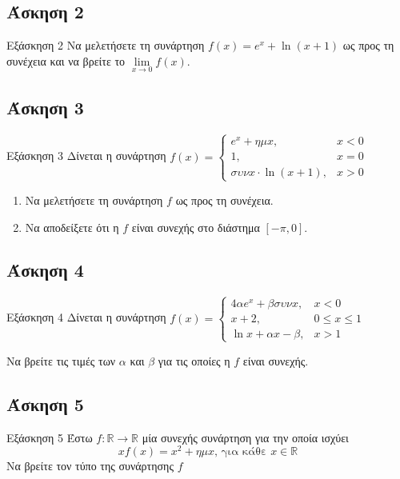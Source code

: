 \documentclass[greek]{beamer}
\begin{document}
\subsection{Άσκηση 2}
\begin{frame}[label=Άσκηση2]{Εξάσκηση 2}
 Να μελετήσετε τη συνάρτηση $f(x)=e^x+\ln (x+1)$ ως προς τη συνέχεια και να βρείτε το $\lim\limits_{x \to 0}{ f(x) }$.


\end{frame}

\subsection{Άσκηση 3}
\begin{frame}[label=Άσκηση3]{Εξάσκηση 3}
 Δίνεται η συνάρτηση $f(x)=\begin{cases}
   e^x+ημx,             & x<0 \\
   1,                   & x=0 \\
   συνx\cdot \ln (x+1), & x>0
  \end{cases}$
 \begin{enumerate}
  \item Να μελετήσετε τη συνάρτηση $f$ ως προς τη συνέχεια.
  \item Να αποδείξετε ότι η $f$ είναι συνεχής στο διάστημα $[-π,0]$.
 \end{enumerate}

\end{frame}


\subsection{Άσκηση 4}
\begin{frame}[label=Άσκηση4]{Εξάσκηση 4}
 Δίνεται η συνάρτηση $f(x)=\begin{cases}
   4αe^x+βσυνx, & x<0         \\
   x+2,         & 0\le x\le 1 \\
   \ln x+αx-β,  & x>1
  \end{cases}$

 Να βρείτε τις τιμές των $α$ και $β$ για τις οποίες η $f$ είναι συνεχής.

\end{frame}

\subsection{Άσκηση 5}
\begin{frame}[label=Άσκηση5]{Εξάσκηση 5}
 Έστω $f:\mathbb{R}\to\mathbb{R}$ μία συνεχής συνάρτηση για την οποία ισχύει
 $$xf(x)=x^2+ημx \text{, για κάθε } x\in\mathbb{R}$$
 Να βρείτε τον τύπο της συνάρτησης $f$

\end{frame}
\end{document}
